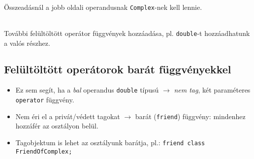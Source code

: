 \documentclass[usenames,dvipsnames,aspectratio=169]{beamer}
\begin{document}
\begin{frame}
    \begin{description}[mm]
        \item[Probléma:] \hfill \\ Összeadásnál a jobb oldali operandusnak \texttt{Complex}-nek kell lennie.
        \item[Megoldás:] \hfill \\ További felültöltött operátor függvények hozzáadása, pl. \texttt{double}-t hozzáadhatunk a valós részhez.
    \end{description}
    \begin{exampleblock}{}
        
    \end{exampleblock}
\end{frame}

\begin{frame}
    \begin{exampleblock}{}
        \small
        
    \end{exampleblock}
\end{frame}

\subsection{Felültöltött operátorok barát függvényekkel}

\begin{frame}
    \begin{itemize}
        \item Ez sem segít, ha a \emph{bal} operandus \texttt{double} típusú $\to$ \emph{nem tag}, két paraméteres \texttt{operator} függvény.
        \item Nem éri el a privát/védett tagokat $\to$ barát (\texttt{friend}) függvény: mindenhez hozzáfér az osztályon belül.
        \item Tagobjektum is lehet az osztályunk barátja, pl.: \texttt{friend class FriendOfComplex;}
    \end{itemize}
\end{frame}

\begin{frame}
    \begin{exampleblock}{}
        \scriptsize
        
        
    \end{exampleblock}
\end{frame}
\end{document}
